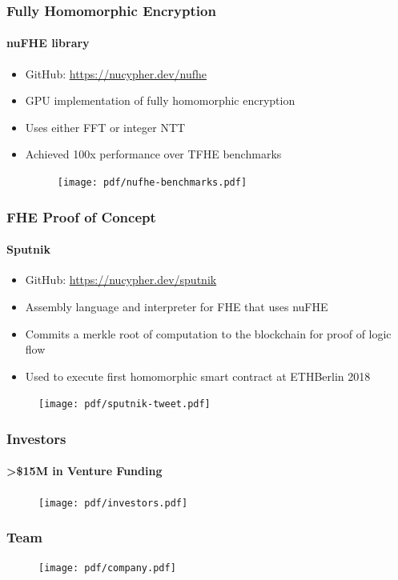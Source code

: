 \documentclass[xetex,mathsans,sans,aspectratio=169]{beamer}
\begin{document}
    \begin{frame}
      \frametitle{Fully Homomorphic Encryption}
       \framesubtitle{nuFHE library}
       \begin{itemize}
           \item GitHub: \url{https://nucypher.dev/nufhe}
           \item GPU implementation of fully homomorphic encryption
           \item Uses either FFT or integer NTT
           \item Achieved 100x performance over TFHE benchmarks
           \begin{figure}
               \texttt{[image: pdf/nufhe-benchmarks.pdf]}
           \end{figure}
       \end{itemize}
     \end{frame}

    \begin{frame}
      \frametitle{FHE Proof of Concept}
      \framesubtitle{Sputnik}
      \begin{itemize}
        \item GitHub: \url{https://nucypher.dev/sputnik}
        \item Assembly language and interpreter for FHE that uses nuFHE
        \item Commits a merkle root of computation to the blockchain for proof of logic flow
        \item Used to execute first homomorphic smart contract at ETHBerlin 2018
      \end{itemize}
      \begin{figure}
        \centering
        \texttt{[image: pdf/sputnik-tweet.pdf]}
      \end{figure}
    \end{frame}

    \begin{frame}
      \frametitle{Investors}
        \framesubtitle{>\$15M in Venture Funding}
        \begin{figure}
            \centering
            \texttt{[image: pdf/investors.pdf]}
        \end{figure}
    \end{frame}

    \begin{frame}
      \frametitle{Team}
        \begin{figure}
            \centering
            \texttt{[image: pdf/company.pdf]}
        \end{figure}
    \end{frame}
\end{document}
